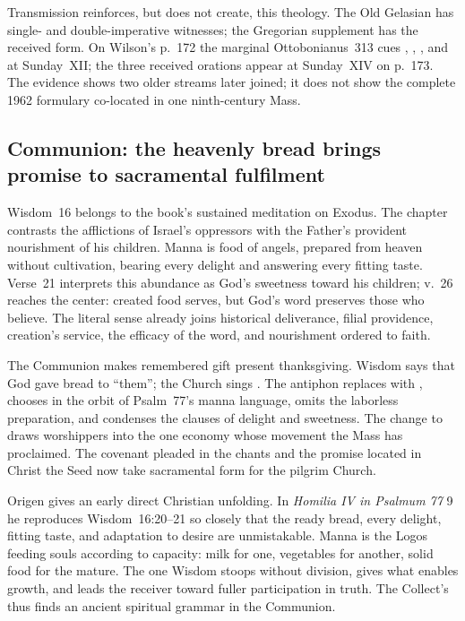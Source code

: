 Transmission reinforces, but does not create, this theology. The Old Gelasian
has single- and double-imperative witnesses; the Gregorian supplement has the
received form. On Wilson's p.~172 the marginal Ottobonianus~313 cues
, , , and  at Sunday~XII; the three received orations appear at Sunday~XIV on
p.~173. The evidence shows two older streams later joined; it
does not show the complete 1962 formulary co-located in one ninth-century Mass.

\subsection*{Communion: the heavenly bread brings promise to sacramental fulfilment\enspace{}}

Wisdom~16 belongs to the book's sustained meditation on Exodus. The chapter
contrasts the afflictions of Israel's oppressors with the Father's provident
nourishment of his children. Manna is food of angels, prepared from heaven
without cultivation, bearing every delight and answering every fitting taste.
Verse~21 interprets this abundance as God's sweetness toward his children;
v.~26 reaches the center: created food serves, but God's word preserves those
who believe. The literal sense already joins historical deliverance, filial
providence, creation's service, the efficacy of the word, and nourishment
ordered to faith.

The Communion makes remembered gift present thanksgiving. Wisdom says that God
gave bread to ``them''; the Church sings . The antiphon replaces  with , chooses
 in the orbit of Psalm~77's manna language, omits the laborless
preparation, and condenses the clauses of delight and sweetness. The change to
 draws worshippers into the one economy whose movement the Mass
has proclaimed. The covenant pleaded in the chants and the promise located in
Christ the Seed now take sacramental form for the pilgrim Church.

Origen gives an early direct Christian unfolding. In \emph{Homilia IV in
Psalmum 77} 9 he reproduces Wisdom~16:20--21 so closely that the ready bread,
every delight, fitting taste, and adaptation to desire are unmistakable. Manna
is the Logos feeding souls according to capacity: milk for one, vegetables for
another, solid food for the mature. The one Wisdom stoops without division,
gives what enables growth, and leads the receiver toward fuller participation
in truth. The Collect's  thus finds an ancient spiritual
grammar in the Communion.

